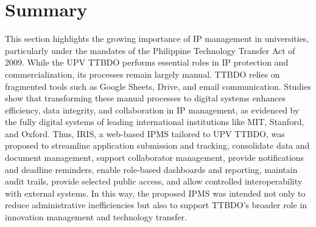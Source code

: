 \section{Summary}
This section highlights the growing importance of IP management in universities, particularly under the mandates of the Philippine Technology Transfer Act of 2009. While the UPV TTBDO performs essential roles in IP protection and commercialization, its processes remain largely manual. TTBDO relies on fragmented tools such as Google Sheets, Drive, and email communication. Studies show that transforming these manual processes to digital systems enhances efficiency, data integrity, and collaboration in IP management, as evidenced by the fully digital systems of leading international institutions like MIT, Stanford, and Oxford. Thus, IRIS, a web-based IPMS tailored to UPV TTBDO, was proposed to streamline application submission and tracking, consolidate data and document management, support collaborator management, provide notifications and deadline reminders, enable role-based dashboards and reporting, maintain audit trails, provide selected public access, and allow controlled interoperability with external systems. In this way, the proposed IPMS was intended not only to reduce administrative inefficiencies but also to support TTBDO’s broader role in innovation management and technology transfer.
